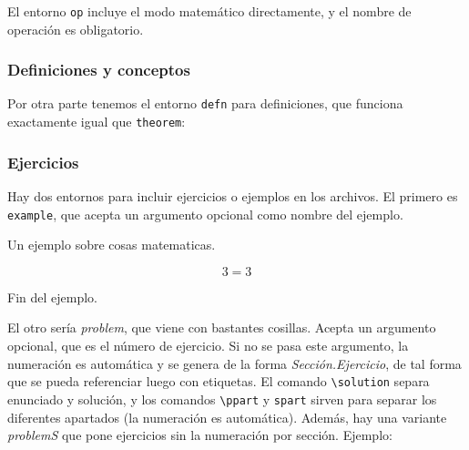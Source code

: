 El entorno \texttt{op} incluye el modo matemático directamente, y el nombre de operación es obligatorio.

\subsubsection{Definiciones y conceptos}

Por otra parte tenemos el entorno \texttt{defn} para definiciones, que funciona exactamente igual que \texttt{theorem}:

\begin{LTXexample}[pos=r]
\begin{defn}
\end{defn}
\end{LTXexample}

\subsubsection{Ejercicios}
\label{sec:Ejercicios}

Hay dos entornos para incluir ejercicios o ejemplos en los archivos. El primero es \texttt{example}, que acepta un argumento opcional como nombre del ejemplo.

\begin{LTXexample}[pos=r]
\begin{example}[Titulo]
Un ejemplo sobre cosas matematicas.

\[ 3 = 3 \]

Fin del ejemplo.
\end{example}
\end{LTXexample}

El otro sería \textit{problem}, que viene con bastantes cosillas. Acepta un argumento opcional, que es el número de ejercicio. Si no se pasa este argumento, la numeración es automática y se genera de la forma \textit{Sección.Ejercicio}, de tal forma que se pueda referenciar luego con etiquetas. El comando \verb|\solution| separa enunciado y solución, y los comandos \verb|\ppart| y \verb|spart| sirven para separar los diferentes apartados (la numeración es automática). Además, hay una variante \textit{problemS} que pone ejercicios sin la numeración por sección. Ejemplo:

